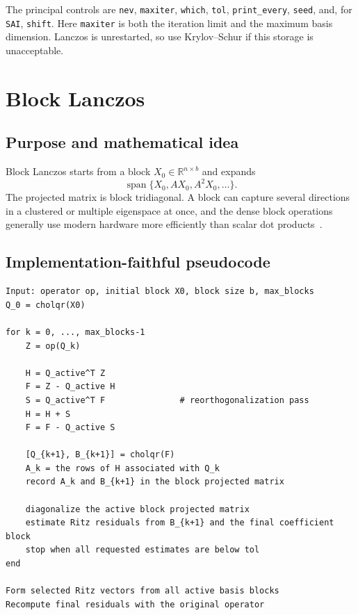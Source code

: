 \documentclass[11pt]{article}
\newcommand{\code}[1]{\texttt{#1}}
\newcommand{\RR}{\mathbb{R}}
\begin{document}
The principal controls are \code{nev}, \code{maxiter}, \code{which},
\code{tol}, \code{print\_every}, \code{seed}, and, for \code{SAI},
\code{shift}.  Here \code{maxiter} is both the iteration limit and the maximum
basis dimension.  Lanczos is unrestarted, so use Krylov--Schur if this storage
is unacceptable.

\section{Block Lanczos}
\label{sec:block-lanczos}

\subsection{Purpose and mathematical idea}

Block Lanczos starts from a block $X_0\in\RR^{n\times b}$ and expands
\begin{equation}
  \operatorname{span}\{X_0,AX_0,A^2X_0,\ldots\}.
\end{equation}
The projected matrix is block tridiagonal.  A block can capture several
directions in a clustered or multiple eigenspace at once, and the dense block
operations generally use modern hardware more efficiently than scalar dot
products~\cite{blocklanczos}.

\subsection{Implementation-faithful pseudocode}

\begin{lstlisting}
Input: operator op, initial block X0, block size b, max_blocks
Q_0 = cholqr(X0)

for k = 0, ..., max_blocks-1
    Z = op(Q_k)

    H = Q_active^T Z
    F = Z - Q_active H
    S = Q_active^T F               # reorthogonalization pass
    H = H + S
    F = F - Q_active S

    [Q_{k+1}, B_{k+1}] = cholqr(F)
    A_k = the rows of H associated with Q_k
    record A_k and B_{k+1} in the block projected matrix

    diagonalize the active block projected matrix
    estimate Ritz residuals from B_{k+1} and the final coefficient block
    stop when all requested estimates are below tol
end

Form selected Ritz vectors from all active basis blocks
Recompute final residuals with the original operator
\end{lstlisting}
\end{document}
